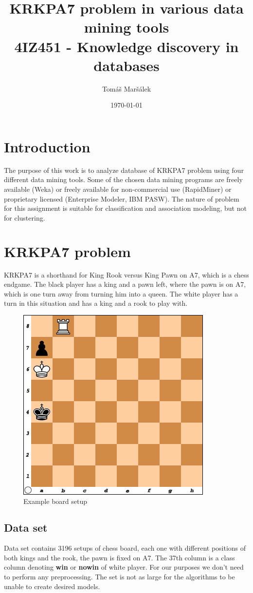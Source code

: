 \documentclass[11pt]{article}
\title{KRKPA7 problem in various data mining tools \\ 4IZ451 - Knowledge discovery in databases}
\author{Tomáš Maršálek}
\date{\today}
\begin{document}
\maketitle
\thispagestyle{empty}
\clearpage

\section{Introduction}
The purpose of this work is to analyze database of KRKPA7 problem using four different data mining tools. Some of the chosen data mining programs are freely available (Weka) or freely available for non-commercial use (RapidMiner) or proprietary licensed (Enterprise Modeler, IBM PASW). %
The nature of problem for this assignment is suitable for classification and association modeling, but not for clustering.

\section{KRKPA7 problem}
KRKPA7 is a shorthand for King Rook versus King Pawn on A7, which is a chess endgame. The black player has a king and a pawn left, where the pawn is on A7, which is one turn away from turning him into a queen. The white player has a turn in this situation and has a king and a rook to play with.

\begin{figure}[!ht]
	\centering
	\includegraphics[width=.7\textwidth]{example}
	\caption{Example board setup}
\end{figure}

\clearpage

\subsection{Data set}
Data set contains 3196 setups of chess board, each one with different positions
of both kings and the rook, the pawn is fixed on A7. The 37th column is a class
column denoting {\bf win} or {\bf nowin} of white player. For our purposes we
don't need to perform any preprocessing. The set is not as large for the
algorithms to be unable to create desired models.
\end{document}
